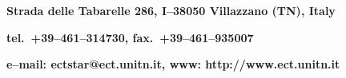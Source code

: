     \begin{center}
        {\bf Strada delle Tabarelle 286, I--38050 Villazzano (TN),
        Italy}
    \end{center}
    \begin{center}
        {\bf tel.\ +39--461--314730, fax.\ +39--461--935007}
    \end{center}
     \begin{center}
        {\bf e--mail: ectstar@ect.unitn.it, www: http://www.ect.unitn.it}
    \end{center}
    \HRule



\clearpage






